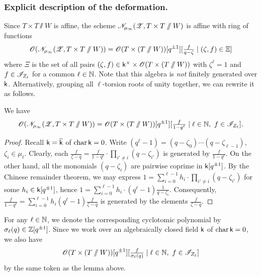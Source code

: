 \subsubsection{Explicit description of the deformation.}
Since $T \times T \sslash W$ is affine, the scheme $\mathscr{N}_{\mu_{\infty}}(\operatorname{\mathscr{Z}}, T \times T \sslash W)$ is affine with ring of functions
\begin{equation*}
\operatorname{\mathscr{O}}(\mathscr{N}_{\mu_{\infty}}(\operatorname{\mathscr{Z}}, T \times T \sslash W))
=
\operatorname{\mathscr{O}}(T \times (T \sslash W))[q^{\pm 1}][\tfrac{f}{q - \zeta} \mid (\zeta, f) \in \Xi]
\end{equation*} 
where $\Xi$ is the set of all pairs $(\zeta, f) \in \mathsf{k}^{\times} \times \operatorname{\mathscr{O}}(T  \times (T \sslash W))$ with $\zeta^{\ell} = 1$ and $f \in \mathscr{I}_{Z_{\ell}}$ for a common $\ell \in \operatorname{\mathbb{N}}$.
Note that this algebra is \textit{not} finitely generated over $\mathsf{k}$.    
Alternatively, grouping all $\ell$-torsion roots of unity together, we can rewrite it as follows.
\begin{lemma}\label{claim: putting ell-th roots of unity together} We have
\begin{equation*}
\operatorname{\mathscr{O}}(\mathscr{N}_{\mu_{\infty}}(\operatorname{\mathscr{Z}}, T \times T \sslash W))
=
\operatorname{\mathscr{O}}(T \times (T \sslash W))[q^{\pm 1}][\tfrac{f}{1 - q^{\ell}} \mid \ell \in \operatorname{\mathbb{N}}, \ f \in \mathscr{I}_{Z_{\ell}}].
\end{equation*}
\end{lemma}
\begin{proof}
Recall $\mathsf{k} = \overline{\mathsf{k}}$ of $\operatorname{char} \mathsf{k} = 0$.
Write $(q^{\ell}-1) = (q-\zeta_0)\cdots (q-\zeta_{\ell-1})$, $\zeta_i \in \mu_{\ell}$. Clearly, each
$\tfrac{f}{\zeta -q} = \tfrac{f}{1 - q^{\ell}} \cdot \prod_{i'\neq i} (q-\zeta_{i'})$ is generated by $\tfrac{f}{1 - q^{\ell}}$.
%
On the other hand, all the monomials $(q-\zeta_i)$ are pairwise coprime in $\mathsf{k}[q^{\pm 1}]$. By the Chinese remainder theorem, we may express
$1 = \sum_{i=0}^{\ell-1} h_i \cdot \prod_{i'\neq i} (q-\zeta_{i'})$ for some $h_i \in \mathsf{k}[q^{\pm 1}]$, 
hence
$1 = \sum_{i=0}^{\ell-1} h_i \cdot (q^{\ell} - 1) \tfrac{1}{q - \zeta_i}.$
Consequently, $\tfrac{f}{1 - q^{\ell}} = \sum_{i=0}^{\ell-1} h_i (q^{\ell} - 1) \tfrac{f}{\zeta - q}$ is generated by the elements $\tfrac{f}{\zeta - q}$.
\end{proof}



\begin{remark}
For any $\ell \in \operatorname{\mathbb{N}}$, we denote the corresponding cyclotomic polynomial by
$\sigma_{\ell}(q) \in \operatorname{\mathbb{Z}}[q^{\pm 1}]$.    
Since we work over an algebraically closed field $\mathsf{k}$ of $\operatorname{char} \mathsf{k} = 0$, we also have
\begin{equation*}
  \operatorname{\mathscr{O}}(T \times (T \sslash W))[q^{\pm 1}][\tfrac{f}{\sigma_{\ell}(q)} \mid \ell \in \operatorname{\mathbb{N}}, \ f \in \mathscr{I}_{Z_{\ell}}]  
\end{equation*}
by the same token as the lemma above.
\end{remark}





